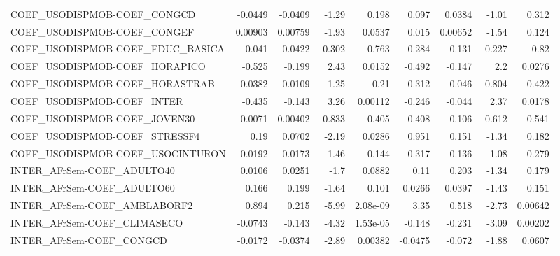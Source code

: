 \begin{tabular}{lrrrrrrrr}
COEF\_USODISPMOB-COEF\_CONGCD           &     -0.0449 &      -0.0409 &    -1.29 &    0.198 &      0.097 &      0.0384 &        -1.01 &         0.312 \\
COEF\_USODISPMOB-COEF\_CONGEF           &     0.00903 &      0.00759 &    -1.93 &   0.0537 &      0.015 &     0.00652 &        -1.54 &         0.124 \\
COEF\_USODISPMOB-COEF\_EDUC\_BASICA      &      -0.041 &      -0.0422 &    0.302 &    0.763 &     -0.284 &      -0.131 &        0.227 &          0.82 \\
COEF\_USODISPMOB-COEF\_HORAPICO         &      -0.525 &       -0.199 &     2.43 &   0.0152 &     -0.492 &      -0.147 &          2.2 &        0.0276 \\
COEF\_USODISPMOB-COEF\_HORASTRAB        &      0.0382 &       0.0109 &     1.25 &     0.21 &     -0.312 &      -0.046 &        0.804 &         0.422 \\
COEF\_USODISPMOB-COEF\_INTER            &      -0.435 &       -0.143 &     3.26 &  0.00112 &     -0.246 &      -0.044 &         2.37 &        0.0178 \\
COEF\_USODISPMOB-COEF\_JOVEN30          &      0.0071 &      0.00402 &   -0.833 &    0.405 &      0.408 &       0.106 &       -0.612 &         0.541 \\
COEF\_USODISPMOB-COEF\_STRESSF4         &        0.19 &       0.0702 &    -2.19 &   0.0286 &      0.951 &       0.151 &        -1.34 &         0.182 \\
COEF\_USODISPMOB-COEF\_USOCINTURON      &     -0.0192 &      -0.0173 &     1.46 &    0.144 &     -0.317 &      -0.136 &         1.08 &         0.279 \\
INTER\_AFrSem-COEF\_ADULTO40            &      0.0106 &       0.0251 &     -1.7 &   0.0882 &       0.11 &       0.203 &        -1.34 &         0.179 \\
INTER\_AFrSem-COEF\_ADULTO60            &       0.166 &        0.199 &    -1.64 &    0.101 &     0.0266 &      0.0397 &        -1.43 &         0.151 \\
INTER\_AFrSem-COEF\_AMBLABORF2          &       0.894 &        0.215 &    -5.99 & 2.08e-09 &       3.35 &       0.518 &        -2.73 &       0.00642 \\
INTER\_AFrSem-COEF\_CLIMASECO           &     -0.0743 &       -0.143 &    -4.32 & 1.53e-05 &     -0.148 &      -0.231 &        -3.09 &       0.00202 \\
INTER\_AFrSem-COEF\_CONGCD              &     -0.0172 &      -0.0374 &    -2.89 &  0.00382 &    -0.0475 &      -0.072 &        -1.88 &        0.0607 \\

\end{tabular}

